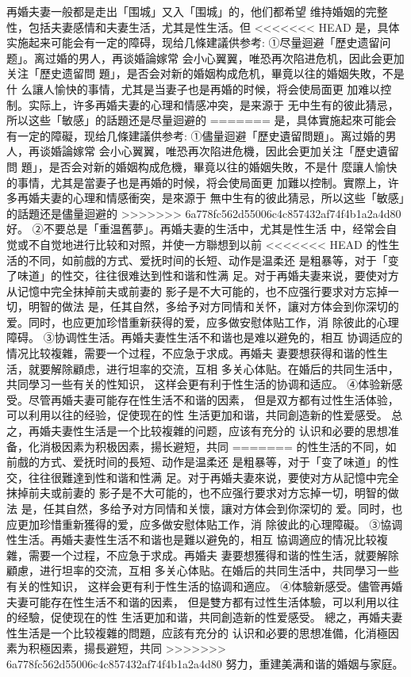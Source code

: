 \documentclass[12pt,UTF8]{ctexbook}
\begin{document}
再婚夫妻一般都是走出「围城」又入「围城」的，他们都希望
维持婚姻的完整性，包括夫妻感情和夫妻生活，尤其是性生活。但
<<<<<<< HEAD
是，具体实施起来可能会有一定的障碍，现给几條建議供参考:
①尽量迴避「歷史遗留问题」。离过婚的男人，再谈婚論嫁常
会小心翼翼，唯恐再次陷进危机，因此会更加关注「歷史遗留問
題」，是否会对新的婚姻构成危机，畢竟以往的婚姻失敗，不是什
么讓人愉快的事情，尤其是当妻子也是再婚的时候，将会使局面更
加难以控制。实际上，许多再婚夫妻的心理和情感冲突，是来源于
无中生有的彼此猜忌，所以这些「敏感」的話題还是尽量迴避的
=======
是，具体實施起來可能会有一定的障礙，现给几條建議供参考:
①儘量迴避「歷史遺留問題」。离过婚的男人，再谈婚論嫁常
会小心翼翼，唯恐再次陷进危機，因此会更加关注「歷史遺留問
題」，是否会对新的婚姻构成危機，畢竟以往的婚姻失敗，不是什
麼讓人愉快的事情，尤其是當妻子也是再婚的时候，将会使局面更
加難以控制。實際上，许多再婚夫妻的心理和情感衝突，是來源于
無中生有的彼此猜忌，所以这些「敏感」的話題还是儘量迴避的
>>>>>>> 6a778fc562d55006c4c857432af74f4b1a2a4d80
好。
②不要总是「重温舊夢」。再婚夫妻的生活中，尤其是性生活
中，经常会自觉或不自觉地进行比较和对照，并使一方聯想到以前
<<<<<<< HEAD
的性生活的不同，如前戲的方式、爱抚时间的长短、动作是温柔还
是粗暴等，对于「变了味道」的性交，往往很难达到性和谐和性满
足。对于再婚夫妻来说，要使对方从记憶中完全抹掉前夫或前妻的
影子是不大可能的，也不应强行要求对方忘掉一切，明智的做法
是，任其自然，多给予对方同情和关怀，讓对方体会到你深切的
爱。同时，也应更加珍惜重新获得的爱，应多做安慰体贴工作，消
除彼此的心理障碍。
③协调性生活。再婚夫妻性生活不和谐也是难以避免的，相互
协调适应的情况比较複雜，需要一个过程，不应急于求成。再婚夫
妻要想获得和谐的性生活，就要解除顧虑，进行坦率的交流，互相
多关心体贴。在婚后的共同生活中，共同學习一些有关的性知识，
这样会更有利于性生活的协调和适应。
④体验新感受。尽管再婚夫妻可能存在性生活不和谐的因素，
但是双方都有过性生活体验，可以利用以往的经验，促使现在的性
生活更加和谐，共同創造新的性爱感受。
总之，再婚夫妻性生活是一个比较複雜的问题，应该有充分的
认识和必要的思想准备，化消极因素为积极因素，揚长避短，共同
=======
的性生活的不同，如前戲的方式、爱抚时间的長短、动作是温柔还
是粗暴等，对于「变了味道」的性交，往往很難達到性和谐和性满
足。对于再婚夫妻來说，要使对方从記憶中完全抹掉前夫或前妻的
影子是不大可能的，也不应强行要求对方忘掉一切，明智的做法
是，任其自然，多给予对方同情和关懷，讓对方体会到你深切的
爱。同时，也应更加珍惜重新獲得的爱，应多做安慰体贴工作，消
除彼此的心理障礙。
③協调性生活。再婚夫妻性生活不和谐也是難以避免的，相互
協调適应的情况比较複雜，需要一个过程，不应急于求成。再婚夫
妻要想獲得和谐的性生活，就要解除顧慮，进行坦率的交流，互相
多关心体贴。在婚后的共同生活中，共同學习一些有关的性知识，
这样会更有利于性生活的協调和適应。
④体驗新感受。儘管再婚夫妻可能存在性生活不和谐的因素，
但是雙方都有过性生活体驗，可以利用以往的经驗，促使现在的性
生活更加和谐，共同創造新的性爱感受。
總之，再婚夫妻性生活是一个比较複雜的問題，应該有充分的
认识和必要的思想准備，化消極因素为积極因素，揚長避短，共同
>>>>>>> 6a778fc562d55006c4c857432af74f4b1a2a4d80
努力，重建美满和谐的婚姻与家庭。
\end{document}
